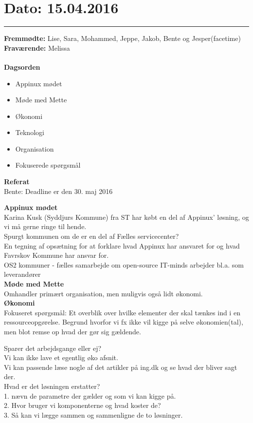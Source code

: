 \section{Dato: 15.04.2016}
\hrule

\textbf{Fremmødte:} Lise, Sara, Mohammed, Jeppe, Jakob, Bente og Jesper(facetime)
\textbf{Fraværende:} Melissa 
\\
\\
\textbf{Dagsorden}
\begin{itemize}
	\item Appinux mødet
	\item Møde med Mette
	\item Økonomi
	\item Teknologi
	\item Organisation
	\item Fokuserede spørgsmål
\end{itemize}

\textbf{Referat} 
\\
Bente: Deadline er den 30. maj 2016

\textbf{Appinux mødet} 
\\
Karina Kusk (Syddjurs Kommune) fra ST har købt en del af Appinux' løsning, og vi må gerne ringe til hende.\\

Spurgt kommunen om de er en del af Fælles servicecenter?\\

En tegning af opsætning for at forklare hvad Appinux har ansvaret for og hvad Favrskov Kommune har ansvar for. \\

OS2 kommuner - fælles samarbejde om open-source
IT-minds arbejder bl.a. som leverandører\\


\textbf{Møde med Mette} 
\\
Omhandler primært organisation, men muligvis også lidt økonomi. \\


\textbf{Økonomi} 
\\
Fokuseret spørgsmål: Et overblik over hvilke elementer der skal tænkes ind i en ressourceopgørelse.
Begrund hvorfor vi fx ikke vil kigge på selve økonomien(tal), men blot remse op hvad der gør sig gældende. 

Sparer det arbejdsgange eller ej? \\
Vi kan ikke lave et egentlig øko afsnit. \\
Vi kan passende læse nogle af det artikler på ing.dk og se hvad der bliver sagt der. \\
Hvad er det løsningen erstatter? \\
1. nævn de parametre der gælder og som vi kan kigge på.\\
2. Hvor bruger vi komponenterne og hvad koster de?\\
3. Så kan vi lægge sammen og sammenligne de to løsninger.\\

